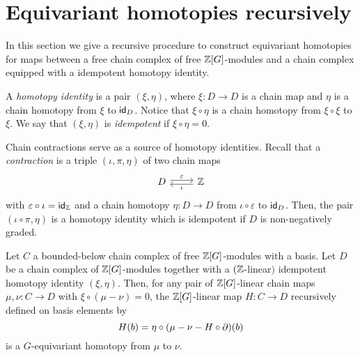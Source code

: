 
\section{Equivariant homotopies recursively}\label{s:equivariant homotopy general}

In this section we give a recursive procedure to construct equivariant homotopies for maps between a free chain complex of free $\mathbb{Z}[G]$-modules and a chain complex equipped with a idempotent homotopy identity.

\begin{definition*}
	A \textit{homotopy identity} is a pair $(\xi,\eta)$, where $\xi \colon D \to D$ is a chain map and $\eta$ is a chain homotopy from $\xi$ to $\mathsf{id}_D$.
	Notice that $\xi \circ \eta$ is a chain homotopy from $\xi \circ \xi$ to $\xi$.
	We say that $(\xi, \eta)$ is \textit{idempotent} if $\xi \circ \eta = 0$.
\end{definition*}

\begin{example*}
	Chain contractions serve as a source of homotopy identities.
	Recall that a \textit{contraction} is a triple $(\iota,\pi,\eta)$ of two chain maps
	\[
	\begin{tikzcd}
		D \arrow[r,"\varepsilon", shift left=2pt] & \Z \arrow[l, "\iota", shift left=2pt]
	\end{tikzcd}
	\]
	with $\varepsilon\circ\iota = \mathsf{id}_{\mathbb{Z}}$ and a chain homotopy $\eta \colon D \to D$ from $\iota\circ\varepsilon$ to $\mathsf{id}_D$.
	Then, the pair $(\iota \circ \pi, \eta)$ is a homotopy identity which is idempotent if $D$ is non-negatively graded.
\end{example*}

\begin{theorem}\label{t:recursive construction}
	Let $C$ a bounded-below chain complex of free $\mathbb{Z}[G]$-modules with a basis.
	Let $D$ be a chain complex of $\mathbb{Z}[G]$-modules together with a $(\mathbb{Z}$-linear$)$ idempotent homotopy identity $(\xi, \eta)$.
	Then, for any pair of $\mathbb{Z}[G]$-linear chain maps $\mu,\nu \colon C \to D$ with $\xi \circ (\mu -\nu) = 0$, the $\mathbb{Z}[G]$-linear map $H \colon C \to D$ recursively defined on basis elements by
	\begin{equation}\label{eq:lemma def}
		H(b) = \eta \circ (\mu - \nu - H \circ \operatorname{\partial})(b)
	\end{equation}
	is a $G$-equivariant homotopy from $\mu$ to $\nu$.
\end{theorem}

